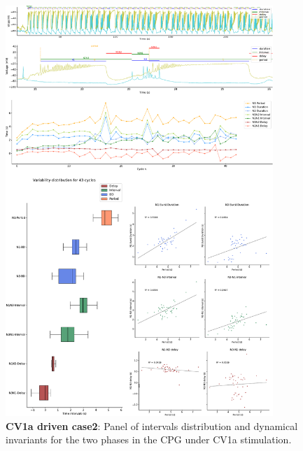 \begin{figure}[htbp]
	\centering
	\includegraphics[width=0.9\textwidth]{./invariants/data/SUSSEX/CV1a_driven2/images/panel_with_intervals.pdf}
	
	\caption{\textbf{CV1a driven case2}: Panel of intervals distribution and dynamical invariants for the two phases in the CPG under CV1a stimulation.}
	\label{fig:cv1a 2 2phases}
\end{figure}



